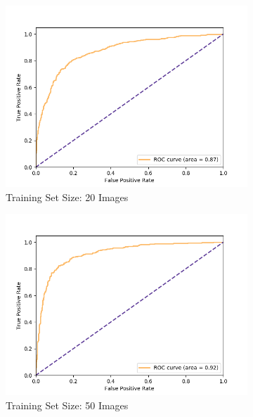 \begin{figure}[ht]
  \centering
    \begin{subfigure}{.49\textwidth}
        \includegraphics[width=\textwidth]{images/score-10-roc.png}
        \caption{Training Set Size: 20 Images}
    \end{subfigure}
    \begin{subfigure}{.49\textwidth}
        \includegraphics[width=\textwidth]{images/score-25-roc.png}
        \caption{Training Set Size: 50 Images}
    \end{subfigure}
    \begin{subfigure}{.49\textwidth}

\end{subfigure}
\end{figure}
